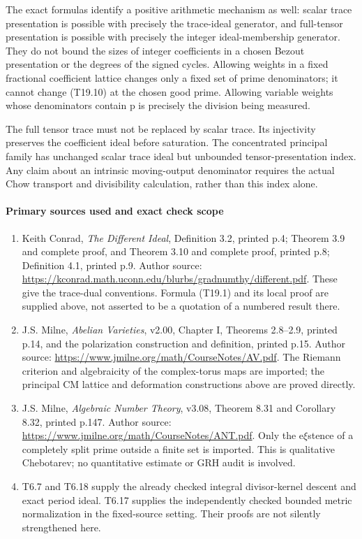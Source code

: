 The exact formulas identify a positive arithmetic mechanism as well: scalar trace presentation is possible with precisely the trace-ideal generator, and full-tensor presentation is possible with precisely the integer ideal-membership generator. They do not bound the sizes of integer coefficients in a chosen Bezout presentation or the degrees of the signed cycles. Allowing weights in a fixed fractional coefficient lattice changes only a fixed set of prime denominators; it cannot change (T19.10) at the chosen good prime. Allowing variable weights whose denominators contain p is precisely the division being measured.

The full tensor trace must not be replaced by scalar trace. Its injectivity preserves the coefficient ideal before saturation. The concentrated principal family has unchanged scalar trace ideal but unbounded tensor-presentation index. Any claim about an intrinsic moving-output denominator requires the actual Chow transport and divisibility calculation, rather than this index alone.

\paragraph{Primary sources used and exact check scope}\label{primary-sources-used-and-exact-check-scope}

\begin{enumerate}
\def\labelenumi{\arabic{enumi}.}
\tightlist
\item
  Keith Conrad, \emph{The Different Ideal}, Definition 3.2, printed p.4; Theorem 3.9 and complete proof, and Theorem 3.10 and complete proof, printed p.8; Definition 4.1, printed p.9. Author source: \url{https://kconrad.math.uconn.edu/blurbs/gradnumthy/different.pdf}. These give the trace-dual conventions. Formula (T19.1) and its local proof are supplied above, not asserted to be a quotation of a numbered result there.
\item
  J.S. Milne, \emph{Abelian Varieties}, v2.00, Chapter I, Theorems 2.8--2.9, printed p.14, and the polarization construction and definition, printed p.15. Author source: \url{https://www.jmilne.org/math/CourseNotes/AV.pdf}. The Riemann criterion and algebraicity of the complex-torus maps are imported; the principal CM lattice and deformation constructions above are proved directly.
\item
  J.S. Milne, \emph{Algebraic Number Theory}, v3.08, Theorem 8.31 and Corollary 8.32, printed p.147. Author source: \url{https://www.jmilne.org/math/CourseNotes/ANT.pdf}. Only the e\(\xi\)stence of a completely split prime outside a finite set is imported. This is qualitative Chebotarev; no quantitative estimate or GRH audit is involved.
\item
  T6.7 and T6.18 supply the already checked integral divisor-kernel descent and exact period ideal. T6.17 supplies the independently checked bounded metric normalization in the fixed-source setting. Their proofs are not silently strengthened here.
\end{enumerate}

